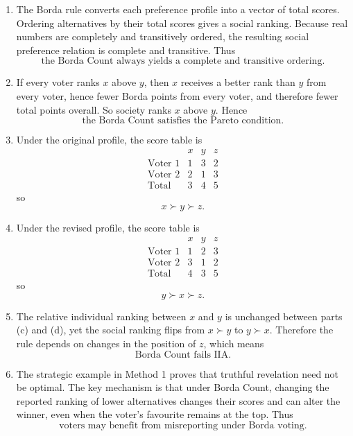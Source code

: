 \documentclass[12pt]{article}
\begin{document}
\begin{enumerate}[label=(\alph*)]
    \item
    The Borda rule converts each preference profile into a vector of total scores. Ordering alternatives by their total scores gives a social ranking. Because real numbers are completely and transitively ordered, the resulting social preference relation is complete and transitive. Thus
    \[
    \boxed{\text{the Borda Count always yields a complete and transitive ordering.}}
    \]

    \item
    If every voter ranks $x$ above $y$, then $x$ receives a better rank than $y$ from every voter, hence fewer Borda points from every voter, and therefore fewer total points overall. So society ranks $x$ above $y$. Hence
    \[
    \boxed{\text{the Borda Count satisfies the Pareto condition.}}
    \]

    \item
    Under the original profile, the score table is
    \[
    \begin{array}{c|ccc}
    & x & y & z \\ \hline
    \text{Voter 1} & 1 & 3 & 2 \\
    \text{Voter 2} & 2 & 1 & 3 \\ \hline
    \text{Total} & 3 & 4 & 5
    \end{array}
    \]
    so
    \[
    \boxed{x \succ y \succ z.}
    \]

    \item
    Under the revised profile, the score table is
    \[
    \begin{array}{c|ccc}
    & x & y & z \\ \hline
    \text{Voter 1} & 1 & 2 & 3 \\
    \text{Voter 2} & 3 & 1 & 2 \\ \hline
    \text{Total} & 4 & 3 & 5
    \end{array}
    \]
    so
    \[
    \boxed{y \succ x \succ z.}
    \]

    \item
    The relative individual ranking between $x$ and $y$ is unchanged between parts (c) and (d), yet the social ranking flips from $x \succ y$ to $y \succ x$. Therefore the rule depends on changes in the position of $z$, which means
    \[
    \boxed{\text{Borda Count fails IIA.}}
    \]

    \item
    The strategic example in Method 1 proves that truthful revelation need not be optimal. The key mechanism is that under Borda Count, changing the reported ranking of lower alternatives changes their scores and can alter the winner, even when the voter's favourite remains at the top. Thus
    \[
    \boxed{\text{voters may benefit from misreporting under Borda voting.}}
    \]
\end{enumerate}
\end{document}
